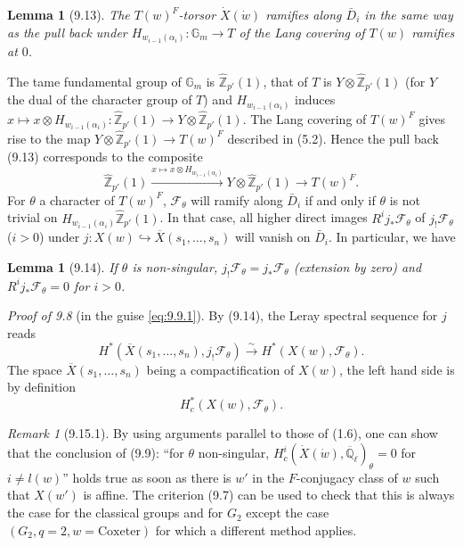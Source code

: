 \documentclass[11pt]{amsart}
\theoremstyle{plain}
\newtheorem{lemma}[theorem]{Lemma}
\theoremstyle{remark}
\newtheorem{remark}[theorem]{Remark}
\begin{document}
\begin{lemma}[9.13]
The $T(w)^F$-torsor $\dot{X}(\dot{w})$ ramifies along $\bar{D}_i$ in the same way as the pull back under $H_{w_{i-1}(\alpha_i)}: \mathbb{G}_m \to T$ of the Lang covering of $T(w)$ ramifies at $0$.
\end{lemma}

The tame fundamental group of $\mathbb{G}_m$ is $\hat{\mathbb{Z}}_{p'}(1)$, that of $T$ is $Y \otimes \hat{\mathbb{Z}}_{p'}(1)$ (for $Y$ the dual of the character group of $T$) and $H_{w_{i-1}(\alpha_i)}$ induces $x \mapsto x \otimes H_{w_{i-1}(\alpha_i)}: \hat{\mathbb{Z}}_{p'}(1) \to Y \otimes \hat{\mathbb{Z}}_{p'}(1)$. The Lang covering of $T(w)^F$ gives rise to the map $Y \otimes \hat{\mathbb{Z}}_{p'}(1) \to T(w)^F$ described in (5.2). Hence the pull back (9.13) corresponds to the composite
\[
\hat{\mathbb{Z}}_{p'}(1) \xrightarrow{x \mapsto x \otimes H_{w_{i-1}(\alpha_i)}} Y \otimes \hat{\mathbb{Z}}_{p'}(1) \longrightarrow T(w)^F.
\]
For $\theta$ a character of $T(w)^F$, $\mathcal{F}_\theta$ will ramify along $\bar{D}_i$ if and only if $\theta$ is not trivial on $H_{w_{i-1}(\alpha_i)} \hat{\mathbb{Z}}_{p'}(1)$. In that case, all higher direct images $R^i j_* \mathcal{F}_\theta$ of $j_! \mathcal{F}_\theta$ ($i > 0$) under $j: X(w) \hookrightarrow \overline{X}(s_1, \dots, s_n)$ will vanish on $\bar{D}_i$. In particular, we have

\begin{lemma}[9.14]
If $\theta$ is non-singular, $j_! \mathcal{F}_\theta = j_* \mathcal{F}_\theta$ (extension by zero) and $R^i j_* \mathcal{F}_\theta = 0$ for $i > 0$.
\end{lemma}

\textit{Proof of 9.8} (in the guise \eqref{eq:9.9.1}). By (9.14), the Leray spectral sequence for $j$ reads
\[
H^*(\overline{X}(s_1, \dots, s_n), j_! \mathcal{F}_\theta) \xrightarrow{\sim} H^*(X(w), \mathcal{F}_\theta).
\]
The space $\overline{X}(s_1, \dots, s_n)$ being a compactification of $X(w)$, the left hand side is by definition
\[
H_c^*(X(w), \mathcal{F}_\theta).
\]

\begin{remark}[9.15.1]
By using arguments parallel to those of (1.6), one can show that the conclusion of (9.9): ``for $\theta$ non-singular, $H_c^i(\dot{X}(\dot{w}), \overline{\mathbb{Q}}_\ell)_\theta = 0$ for $i \neq l(w)$'' holds true as soon as there is $w'$ in the $F$-conjugacy class of $w$ such that $X(w')$ is affine. The criterion (9.7) can be used to check that this is always the case for the classical groups and for $G_2$ except the case $(G_2, q = 2, w = \text{Coxeter})$ for which a different method applies.
\end{remark}
\end{document}
